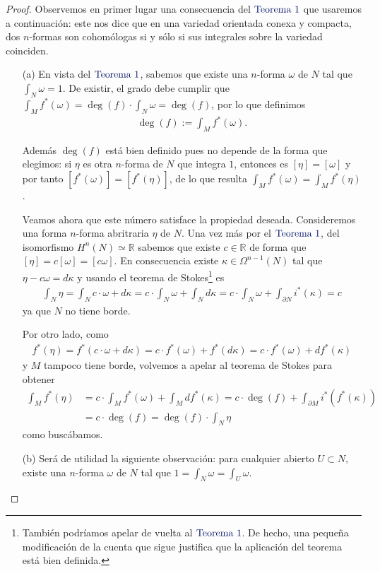\documentclass[11pt]{article}
\newcommand{\R}{\mathbb{R}}
\newcommand{\paint}[1]{\color{color}{#1}}
\newcommand{\tpaing}[1]{\paint{\text{#1}}}
\begin{document}
\begin{proof} Observemos en primer lugar una consecuencia del $\tpaing{Teorema $1$}$ que usaremos a continuación: este nos dice que en una variedad orientada conexa y compacta, dos $n$-formas son cohomólogas si y sólo si sus integrales sobre la variedad coinciden.
\begin{itemize}[listparindent = \parindent] 
\item[(a)] En vista del $\tpaing{Teorema $1$}$, sabemos que existe una $n$-forma $\omega$ de $N$ tal que $\int_N \omega = 1$. De existir, el grado debe cumplir que $\int_M f^*(\omega) = \deg(f) \cdot \int_N \omega = \deg(f)$, por lo que definimos
\begin{align*}
\deg(f) := \int_M f^*(\omega).
\end{align*}

Además $\deg(f)$ está bien definido pues no depende de la forma que elegimos: si $\eta$ es otra $n$-forma de $N$ que integra $1$, entonces es $[\eta] = [\omega]$ y por tanto $[f^*(\omega)] = [f^*(\eta)]$, de lo que resulta $\int_M f^*(\omega) = \int_M f^*(\eta)$. 

Veamos ahora que este número satisface la propiedad deseada. Consideremos una forma $n$-forma abritraria $\eta$ de $N$. Una vez más por el $\tpaing{Teorema $1$}$, del isomorfismo $H^n(N) \simeq \R$ sabemos que existe $c \in \R$ de forma que $[\eta] = c[\omega] = [c\omega]$. En consecuencia existe $\kappa \in \Omega^{n-1}(N)$ tal que $\eta - c\omega = d\kappa$ y usando el teorema de Stokes\footnote{También podríamos apelar de vuelta al $\tpaing{Teorema $1$}$. De hecho, una pequeña modificación de la cuenta que sigue justifica que la aplicación del teorema está bien definida.} es
\begin{align*}
\int_N \eta = \int_N c \cdot \omega + d\kappa = c\cdot\int_N\omega + \int_Nd\kappa = c\cdot\int_N\omega + \int_{\partial N}i^*(\kappa) = c
\end{align*}  
ya que $N$ no tiene borde. 

Por otro lado, como
\begin{align*}
f^*(\eta) = f^*(c\cdot\omega + d\kappa) = c\cdot f^*(\omega) + f^*(d\kappa) = c\cdot f^*(\omega) + df^*(\kappa)
\end{align*}
y $M$ tampoco tiene borde, volvemos a apelar al teorema de Stokes para obtener
\begin{align*}
\int_M f^*(\eta) &= c\cdot\int_M f^*(\omega) + \int_M df^*(\kappa) = c \cdot \deg(f) + \int_{\partial M}i^*(f^*(\kappa))\\
&= c \cdot \deg(f) = \deg(f) \cdot \int_N \eta
\end{align*}
como buscábamos.
\item[(b)] Será de utilidad la siguiente observación: para cualquier abierto $U \subset N$, existe una $n$-forma $\omega$ de $N$ tal que $1 = \int_N \omega = \int_U \omega$. 


\end{itemize}
\end{proof}
\end{document}
